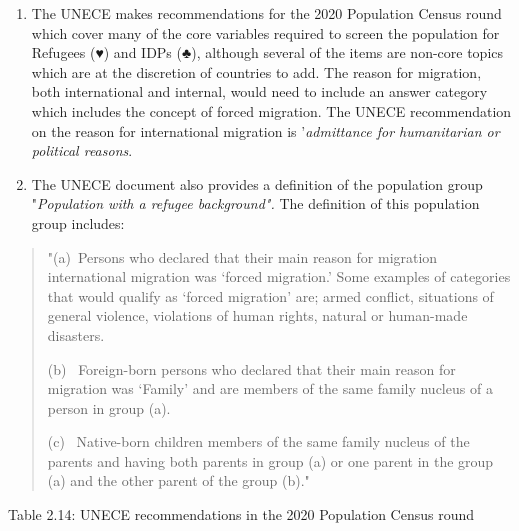\documentclass[
]{article}
\begin{document}
\begin{enumerate}
\def\labelenumi{\arabic{enumi}.}
\setcounter{enumi}{95}
\item
  The UNECE makes recommendations for the 2020 Population Census round
  which cover many of the core variables required to screen the
  population for Refugees (♥) and IDPs (♣), although several of the
  items are non-core topics which are at the discretion of countries
  to add. The reason for migration, both international and internal,
  would need to include an answer category which includes the concept
  of forced migration. The UNECE recommendation on the reason for
  international migration is '\emph{admittance for humanitarian or
  political reasons}.
\item
  The UNECE document also provides a definition of the population
  group "\emph{Population with a refugee background".} The definition of
  this population group includes:
\end{enumerate}

\begin{quote}
"(a)~Persons who declared that their main reason for migration
international migration was `forced migration.' Some examples of
categories that would qualify as `forced migration' are; armed
conflict, situations of general violence, violations of human rights,
natural or human-made disasters.

(b) ~Foreign-born persons who declared that their main reason for
migration was `Family' and are members of the same family nucleus of a
person in group (a).

(c) ~Native-born children members of the same family nucleus of the
parents and having both parents in group (a) or one parent in the group
(a) and the other parent of the group (b)."
\end{quote}

Table 2.14: UNECE recommendations in the 2020 Population Census round
\end{document}
